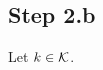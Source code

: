 \subsection{Step 2.b}
\begin{comment}
  \begin{rem}
    Since we know, that $\Sto_{\theta}^k$ is trivial, if $k\notin\cK_\theta$ we
    can write
    \begin{align*}
      \prod_{\theta\in\cA}\prod_{k\in\cK}\Sto_\theta^k(A^0)
      &\equiv \prod_{k\in\cK}\prod_{\theta\in\cA}\Sto_\theta^k(A^0)
      \\&= \prod_{k\in\cK} \prod_{j=1}^{2\cdot k}
     \Sto_{\theta_0+\frac{\pi}{k}\cdot j}^k(A^0) \,.
    \end{align*}
  \end{rem}
\end{comment}

Let $k\in\mathcal{K}$.

